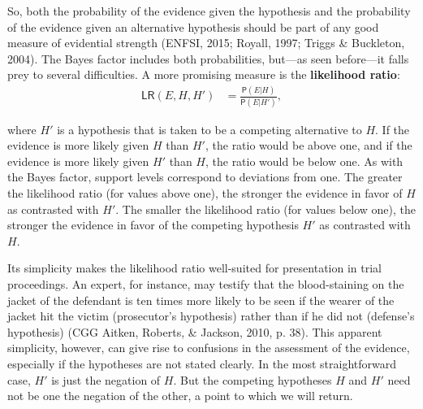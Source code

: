 \documentclass[
  10pt,
  dvipsnames,enabledeprecatedfontcommands]{scrartcl}
\newcommand{\pr}[1]{\mathsf{P}(#1)}
\begin{document}
So, both the probability of the evidence given the hypothesis and the
probability of the evidence given an alternative hypothesis should be
part of any good measure of evidential strength (ENFSI, 2015; Royall,
1997; Triggs \& Buckleton, 2004). The Bayes factor includes both
probabilities, but---as seen before---it falls prey to several
difficulties. A more promising measure is the \textbf{likelihood ratio}:
\begin{align}
\label{eq:LR}
\tag{LR}
\mathsf{LR}(E,H,H') & = \frac{\pr{E \vert H}}{\pr{E \vert H'}},
\end{align}

\noindent where \(H'\) is a hypothesis that is taken to be a competing
alternative to \(H\). If the evidence is more likely given \(H\) than
\(H'\), the ratio would be above one, and if the evidence is more likely
given \(H'\) than \(H\), the ratio would be below one. As with the Bayes
factor, support levels correspond to deviations from one. The greater
the likelihood ratio (for values above one), the stronger the evidence
in favor of \(H\) as contrasted with \(H'\). The smaller the likelihood
ratio (for values below one), the stronger the evidence in favor of the
competing hypothesis \(H'\) as contrasted with \(H\).

Its simplicity makes the likelihood ratio well-suited for presentation
in trial proceedings. An expert, for instance, may testify that the
blood-staining on the jacket of the defendant is ten times more likely
to be seen if the wearer of the jacket hit the victim (prosecutor's
hypothesis) rather than if he did not (defense's hypothesis) (CGG
Aitken, Roberts, \& Jackson, 2010, p. 38). This apparent simplicity,
however, can give rise to confusions in the assessment of the evidence,
especially if the hypotheses are not stated clearly. In the most
straightforward case, \(H'\) is just the negation of \(H\). But the
competing hypotheses \(H\) and \(H'\) need not be one the negation of
the other, a point to which we will return.
\end{document}
